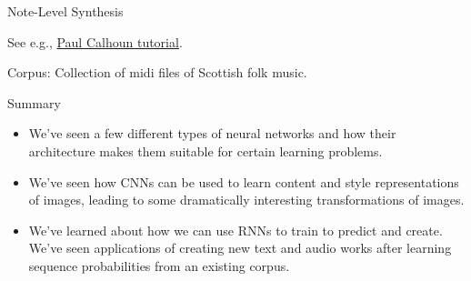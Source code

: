 \documentclass[12pt,t]{beamer}
\begin{document}
\begin{frame}{Note-Level Synthesis}

See e.g., \href{https://www.youtube.com/watch?v=4tujdi8yyow&t=17s}{\color{blue}Paul Calhoun tutorial}.

Corpus: Collection of midi files of Scottish folk music.

\end{frame}

\begin{frame}{Summary}

\begin{itemize}
\item We've seen a few different types of neural networks and how their architecture makes them suitable for certain learning problems.

\item We've seen how CNNs can be used to learn content and style representations of images, leading to some dramatically interesting transformations of images.

\item We've learned about how we can use RNNs to train to predict and create.  We've seen applications of  creating new text and audio works after learning sequence probabilities from an existing corpus.
\end{itemize}

\end{frame}
\end{document}
